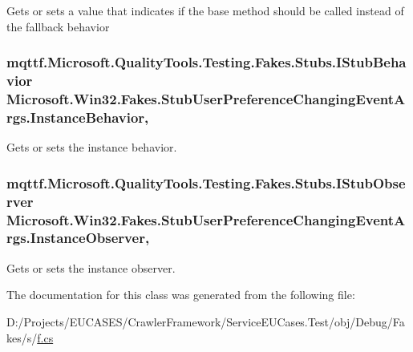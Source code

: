Gets or sets a value that indicates if the base method should be called instead of the fallback behavior

\hypertarget{class_microsoft_1_1_win32_1_1_fakes_1_1_stub_user_preference_changing_event_args_a332a786318c08e5cc707419cd425253a}{
\subsubsection[{Instance\-Behavior}]{\setlength{\rightskip}{0pt plus 5cm}mqttf.\-Microsoft.\-Quality\-Tools.\-Testing.\-Fakes.\-Stubs.\-I\-Stub\-Behavior Microsoft.\-Win32.\-Fakes.\-Stub\-User\-Preference\-Changing\-Event\-Args.\-Instance\-Behavior\hspace{0.3cm}{\ttfamily [get]}, {\ttfamily [set]}}}\label{class_microsoft_1_1_win32_1_1_fakes_1_1_stub_user_preference_changing_event_args_a332a786318c08e5cc707419cd425253a}


Gets or sets the instance behavior.

\hypertarget{class_microsoft_1_1_win32_1_1_fakes_1_1_stub_user_preference_changing_event_args_a3ec6beb5af03e9c6a035e2bfd41f3c07}{
\subsubsection[{Instance\-Observer}]{\setlength{\rightskip}{0pt plus 5cm}mqttf.\-Microsoft.\-Quality\-Tools.\-Testing.\-Fakes.\-Stubs.\-I\-Stub\-Observer Microsoft.\-Win32.\-Fakes.\-Stub\-User\-Preference\-Changing\-Event\-Args.\-Instance\-Observer\hspace{0.3cm}{\ttfamily [get]}, {\ttfamily [set]}}}\label{class_microsoft_1_1_win32_1_1_fakes_1_1_stub_user_preference_changing_event_args_a3ec6beb5af03e9c6a035e2bfd41f3c07}


Gets or sets the instance observer.



The documentation for this class was generated from the following file\-:\begin{DoxyCompactItemize}
\item 
D\-:/\-Projects/\-E\-U\-C\-A\-S\-E\-S/\-Crawler\-Framework/\-Service\-E\-U\-Cases.\-Test/obj/\-Debug/\-Fakes/s/\hyperlink{s_2f_8cs}{f.\-cs}\end{DoxyCompactItemize}

